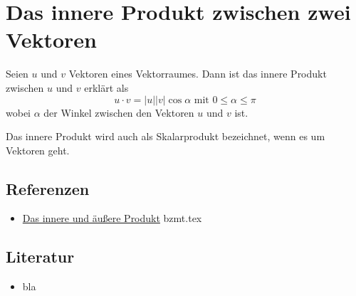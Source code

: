 \documentclass{sajzk}
\begin{document}
\section{Das innere Produkt zwischen zwei Vektoren}
\label{92ch}

Seien $u$ und $v$ Vektoren eines Vektorraumes. Dann ist das innere Produkt
zwischen $u$ und $v$ erklärt als
$$u\cdot v = |u||v|\cos \alpha \textrm{ mit } 0\leq \alpha\leq \pi$$
wobei $\alpha$ der Winkel zwischen den Vektoren $u$ und $v$ ist.

Das innere Produkt wird auch als Skalarprodukt bezeichnet, wenn es um Vektoren
geht.

\subsection{Referenzen} 
\begin{itemize}
    \item \href{bzmt.pdf}{Das innere und äußere Produkt} bzmt.tex
\end{itemize}

\subsection{Literatur} 

\begin{itemize}
    \item bla
\end{itemize}
\end{document}
